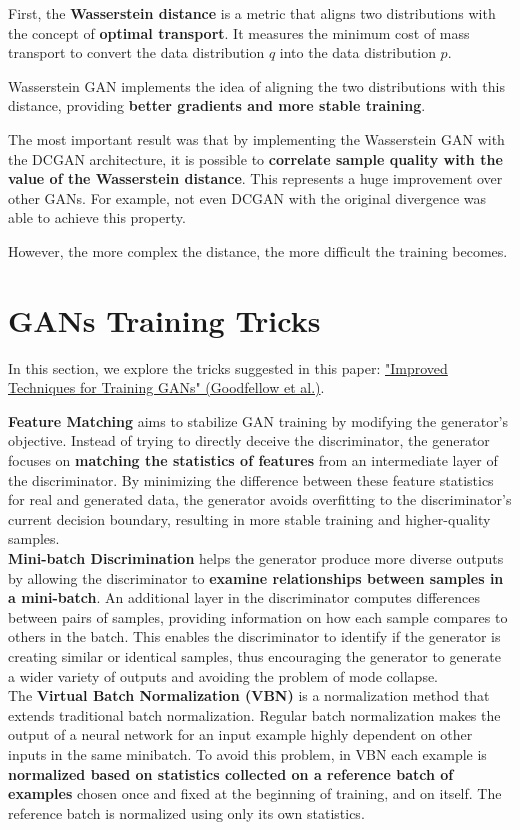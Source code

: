 First, the \textbf{Wasserstein distance} is a metric that aligns two distributions with the concept of \textbf{optimal transport}. It measures the minimum cost of mass transport to convert the data distribution $q$ into the data distribution $p$.

Wasserstein GAN implements the idea of aligning the two distributions with this distance, providing \textbf{better gradients and more stable training}.

The most important result was that by implementing the Wasserstein GAN with the DCGAN architecture, it is possible to \textbf{correlate sample quality with the value of the Wasserstein distance}. This represents a huge improvement over other GANs. For example, not even DCGAN with the original divergence was able to achieve this property.

However, the more complex the distance, the more difficult the training becomes.

\section{GANs Training Tricks}

In this section, we explore the tricks suggested in this paper: \href{https://arxiv.org/pdf/1606.03498}{"Improved Techniques for Training GANs" (Goodfellow et al.)}.


\begin{outline}
\textbf{Feature Matching} aims to stabilize GAN training by modifying the generator's objective. Instead of trying to directly deceive the discriminator, the generator focuses on \textbf{matching the statistics of features} from an intermediate layer of the discriminator. By minimizing the difference between these feature statistics for real and generated data, the generator avoids overfitting to the discriminator's current decision boundary, resulting in more stable training and higher-quality samples.
\\

\textbf{Mini-batch Discrimination} helps the generator produce more diverse outputs by allowing the discriminator to \textbf{examine relationships between samples in a mini-batch}. An additional layer in the discriminator computes differences between pairs of samples, providing information on how each sample compares to others in the batch. This enables the discriminator to identify if the generator is creating similar or identical samples, thus encouraging the generator to generate a wider variety of outputs and avoiding the problem of mode collapse.
\\

The \textbf{Virtual Batch Normalization (VBN)} is a normalization method that extends traditional batch normalization. Regular batch normalization makes the output of a neural network for an input example highly dependent on other inputs in the same minibatch. To avoid this problem, in VBN each example is \textbf{normalized based on statistics collected on a reference batch of examples} chosen once and fixed at the beginning of training, and on itself. The reference batch is normalized using only its own statistics. 
\end{outline}


